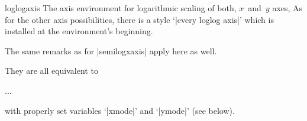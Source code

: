 \begin{environment}{{loglogaxis}}
The axis environment for logarithmic scaling of both, $x$~and~$y$ axes,
As for the other axis possibilities, there is a style `|every loglog axis|' which is installed at the environment's beginning.

The same remarks as for |semilogxaxis| apply here as well.
\end{environment}

\noindent
They are all equivalent to
\begin{codeexample}
\begin{axis}[
	xmode=log|normal,
	ymode=log|normal]
...
\end{axis}
\end{codeexample}
\noindent
with properly set variables `|xmode|' and `|ymode|' (see below).

